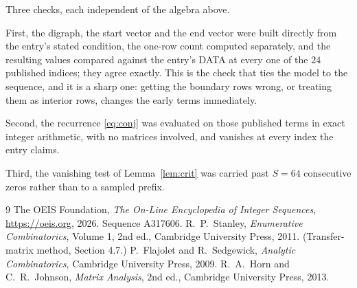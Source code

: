 \documentclass[11pt,a4paper]{article}
\theoremstyle{plain}
\theoremstyle{definition}
\begin{document}
Three checks, each independent of the algebra above.

First, the digraph, the start vector and the end vector were built directly from the
entry's stated condition, the one-row count computed separately, and the resulting values
compared against the entry's DATA at every one of the $24$ published indices; they
agree exactly. This is the check that ties the model to the sequence, and it is a sharp one:
getting the boundary rows wrong, or treating them as interior rows, changes the early terms
immediately.

Second, the recurrence \eqref{eq:conj} was evaluated on those published terms in exact
integer arithmetic, with no matrices involved, and vanishes at every index the entry claims.

Third, the vanishing test of Lemma~\ref{lem:crit} was carried past $S=64$ consecutive
zeros rather than to a sampled prefix.

\begin{thebibliography}{9}
 The OEIS Foundation, \emph{The On-Line Encyclopedia of Integer
Sequences}, \url{https://oeis.org}, 2026. Sequence A317606.
 R.~P.~Stanley, \emph{Enumerative Combinatorics}, Volume 1, 2nd ed.,
Cambridge University Press, 2011. (Transfer-matrix method, Section 4.7.)
 P.~Flajolet and R.~Sedgewick, \emph{Analytic Combinatorics}, Cambridge
University Press, 2009.
 R.~A.~Horn and C.~R.~Johnson, \emph{Matrix Analysis}, 2nd ed., Cambridge
University Press, 2013.
\end{thebibliography}
\end{document}
